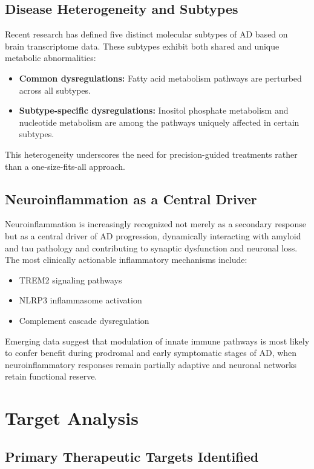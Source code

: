 \documentclass[11pt, a4paper]{article}
\begin{document}
\subsection{Disease Heterogeneity and Subtypes}
Recent research has defined five distinct molecular subtypes of AD based on brain transcriptome data. These subtypes exhibit both shared and unique metabolic abnormalities:
\begin{itemize}
    \item \textbf{Common dysregulations:} Fatty acid metabolism pathways are perturbed across all subtypes.
    \item \textbf{Subtype-specific dysregulations:} Inositol phosphate metabolism and nucleotide metabolism are among the pathways uniquely affected in certain subtypes.
\end{itemize}
This heterogeneity underscores the need for precision-guided treatments rather than a one-size-fits-all approach.

\subsection{Neuroinflammation as a Central Driver}
Neuroinflammation is increasingly recognized not merely as a secondary response but as a central driver of AD progression, dynamically interacting with amyloid and tau pathology and contributing to synaptic dysfunction and neuronal loss. The most clinically actionable inflammatory mechanisms include:
\begin{itemize}
    \item TREM2 signaling pathways
    \item NLRP3 inflammasome activation
    \item Complement cascade dysregulation
\end{itemize}
Emerging data suggest that modulation of innate immune pathways is most likely to confer benefit during prodromal and early symptomatic stages of AD, when neuroinflammatory responses remain partially adaptive and neuronal networks retain functional reserve.

\section{Target Analysis}

\subsection{Primary Therapeutic Targets Identified}
\end{document}
